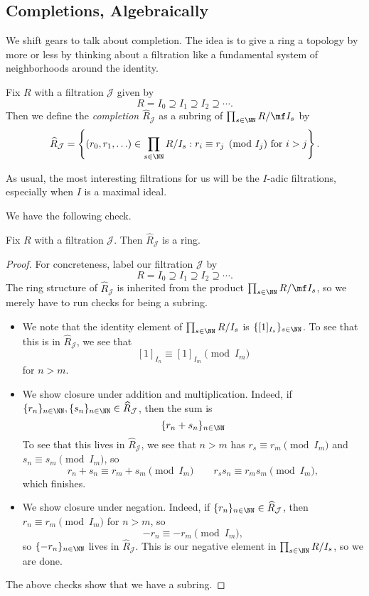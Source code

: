 \subsection{Completions, Algebraically}
We shift gears to talk about completion. The idea is to give a ring a topology by more or less by thinking about a filtration like a fundamental system of neighborhoods around the identity.
\begin{definition}
	Fix $R$ with a filtration $\mathcal J$ given by
	\[R=I_0\supseteq I_1\supseteq I_2\supseteq\cdots.\]
	Then we define the \textit{completion $\widehat R_\mathcal J$} as a subring of $\prod_{s\in\NN}R/\mf I_s$ by
	\[\widehat R_\mathcal J=\left\{(r_0,r_1,\ldots)\in\prod_{s\in\NN}R/I_s:r_i\equiv r_j\pmod{I_j}\text{ for }i>j\right\}.\]
\end{definition}
As usual, the most interesting filtrations for us will be the $I$-adic filtrations, especially when $I$ is a maximal ideal.

We have the following check.
\begin{lemma}
	Fix $R$ with a filtration $\mathcal J$. Then $\widehat R_\mathcal J$ is a ring.
\end{lemma}
\begin{proof}
	For concreteness, label our filtration $\mathcal J$ by
	\[R=I_0\supseteq I_1\supseteq I_2\supseteq\cdots.\]
	The ring structure of $\widehat R_\mathcal J$ is inherited from the product $\prod_{s\in\NN}R/\mf I_s$, so we merely have to run checks for being a subring.
	\begin{itemize}
		\item We note that the identity element of $\prod_{s\in\NN}R/I_s$ is $\{[1]_{I_s}\}_{s\in\NN}$. To see that this is in $\widehat R_\mathcal J$, we see that
		\[[1]_{I_n}\equiv[1]_{I_m}\pmod{I_m}\]
		for $n>m$.
		\item We show closure under addition and multiplication. Indeed, if $\{r_n\}_{n\in\NN},\{s_n\}_{n\in\NN}\in\widehat R_\mathcal J$, then the sum is
		\[\{r_n+s_n\}_{n\in\NN}\]
		To see that this lives in $\widehat R_\mathcal J$, we see that $n>m$ has $r_s\equiv r_m\pmod{I_m}$ and $s_n\equiv s_m\pmod{I_m}$, so
		\[r_n+s_n\equiv r_m+s_m\pmod{I_m}\qquad r_ss_n\equiv r_ms_m\pmod{I_m},\]
		which finishes.
		\item We show closure under negation. Indeed, if $\{r_n\}_{n\in\NN}\in\widehat R_\mathcal J$, then $r_n\equiv r_m\pmod{I_m}$ for $n>m$, so
		\[-r_n\equiv-r_m\pmod{I_m},\]
		so $\{-r_n\}_{n\in\NN}$ lives in $\widehat R_\mathcal J$. This is our negative element in $\prod_{s\in\NN}R/I_s$, so we are done.
	\end{itemize}
	The above checks show that we have a subring.
\end{proof}

